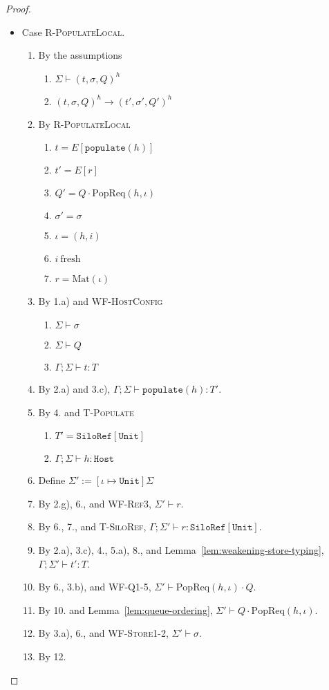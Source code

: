 \documentclass{article}
\theoremstyle{definition}
\newcommand{\Mat}[1]{\text{Mat}(#1)}
\newcommand{\PopReq}[2]{\text{PopReq}(#1, #2)}
\begin{document}
\begin{proof}
\begin{itemize}
\item Case \textsc{R-PopulateLocal}.
\begin{enumerate}
\item By the assumptions
  \begin{enumerate}[label=(\alph*)]
  \item $\Sigma \vdash (t, \sigma, Q)^h$
  \item $(t, \sigma, Q)^h \longrightarrow (t', \sigma', Q')^h$
  \end{enumerate}
\item By \textsc{R-PopulateLocal}
  \begin{enumerate}[label=(\alph*)]
  \item $t = E[\texttt{populate}(h)]$
  \item $t' = E[r]$
  \item $Q' = Q \cdot {\PopReq h \iota}$
  \item $\sigma' = \sigma$
  \item $\iota = (h, i)$
  \item $i~\text{fresh}$
  \item $r = {\Mat \iota}$
  \end{enumerate}
\item By 1.a) and \textsc{WF-HostConfig}
  \begin{enumerate}[label=(\alph*)]
  \item $\Sigma \vdash \sigma$
  \item $\Sigma \vdash Q$
  \item $\Gamma ; \Sigma \vdash t : T$
  \end{enumerate}
\item By 2.a) and 3.c), $\Gamma ; \Sigma \vdash \texttt{populate}(h) : T'$.
\item By 4. and \textsc{T-Populate}
  \begin{enumerate}[label=(\alph*)]
  \item $T' = \texttt{SiloRef}[\texttt{Unit}]$
  \item $\Gamma ; \Sigma \vdash h : \texttt{Host}$
  \end{enumerate}
\item Define $\Sigma' := [\iota \mapsto \texttt{Unit}]\Sigma$
\item By 2.g), 6., and \textsc{WF-Ref3}, $\Sigma' \vdash r$.
\item By 6., 7., and \textsc{T-SiloRef}, $\Gamma ; \Sigma' \vdash r : \texttt{SiloRef}[\texttt{Unit}]$.
\item By 2.a), 3.c), 4., 5.a), 8., and Lemma~\ref{lem:weakening-store-typing}, $\Gamma ; \Sigma' \vdash t' : T$.
\item By 6., 3.b), and \textsc{WF-Q1-5}, $\Sigma' \vdash {\PopReq h \iota} \cdot Q$. 
\item By 10. and Lemma~\ref{lem:queue-ordering}, $\Sigma' \vdash Q \cdot {\PopReq h \iota}$.
\item By 3.a), 6., and \textsc{WF-Store1-2}, $\Sigma' \vdash \sigma$.
\item By 12.


\end{enumerate}
\end{itemize}
\end{proof}
\end{document}

